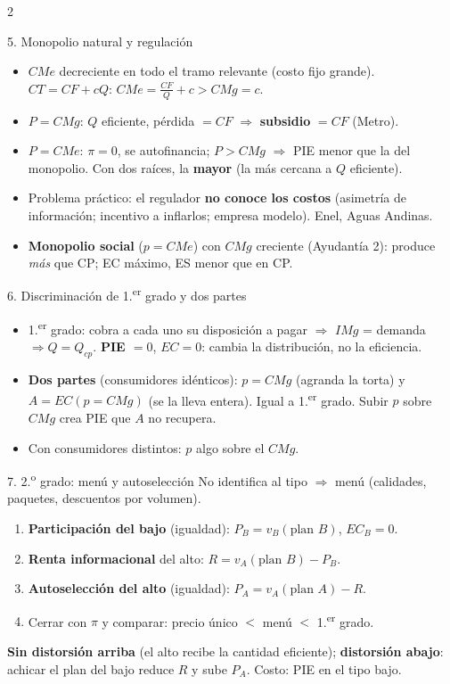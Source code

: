 \documentclass[10pt]{article}
\begin{document}
\begin{multicols}{2}
\begin{caja}{5. Monopolio natural y regulación}
\begin{itemize}
\item $CMe$ decreciente en todo el tramo relevante (costo fijo grande). $CT = CF + cQ$: $CMe = \tfrac{CF}{Q} + c > CMg = c$.
\item $P = CMg$: $Q$ eficiente, pérdida $= CF$ $\Rightarrow$ \textbf{subsidio} $= CF$ (Metro).
\item $P = CMe$: $\pi = 0$, se autofinancia; $P > CMg$ $\Rightarrow$ PIE menor que la del monopolio. Con dos raíces, la \textbf{mayor} (la más cercana a $Q$ eficiente).
\item Problema práctico: el regulador \textbf{no conoce los costos} (asimetría de información; incentivo a inflarlos; empresa modelo). Enel, Aguas Andinas.
\item \textbf{Monopolio social} ($p = CMe$) con $CMg$ creciente (Ayudantía 2): produce \emph{más} que CP; EC máximo, ES menor que en CP.
\end{itemize}
\end{caja}

\begin{caja}{6. Discriminación de 1.\textsuperscript{er} grado y dos partes}
\begin{itemize}
\item 1.\textsuperscript{er} grado: cobra a cada uno su disposición a pagar $\Rightarrow$ $IMg$ = demanda $\Rightarrow Q = Q_{cp}$. \textbf{PIE $= 0$}, $EC = 0$: cambia la distribución, no la eficiencia.
\item \textbf{Dos partes} (consumidores idénticos): $p = CMg$ (agranda la torta) y $A = EC(p = CMg)$ (se la lleva entera). Igual a 1.\textsuperscript{er} grado. Subir $p$ sobre $CMg$ crea PIE que $A$ no recupera.
\item Con consumidores distintos: $p$ algo sobre el $CMg$.
\end{itemize}
\end{caja}

\begin{caja}{7. 2.\textsuperscript{o} grado: menú y autoselección}
No identifica al tipo $\Rightarrow$ menú (calidades, paquetes, descuentos por volumen).
\begin{enumerate}
\item \textbf{Participación del bajo} (igualdad): $P_B = v_B(\text{plan }B)$, $EC_B = 0$.
\item \textbf{Renta informacional} del alto: $R = v_A(\text{plan }B) - P_B$.
\item \textbf{Autoselección del alto} (igualdad): $P_A = v_A(\text{plan }A) - R$.
\item Cerrar con $\pi$ y comparar: precio único $<$ menú $<$ 1.\textsuperscript{er} grado.
\end{enumerate}
\textbf{Sin distorsión arriba} (el alto recibe la cantidad eficiente); \textbf{distorsión abajo}: achicar el plan del bajo reduce $R$ y sube $P_A$. Costo: PIE en el tipo bajo.
\end{caja}


\end{multicols}
\end{document}
